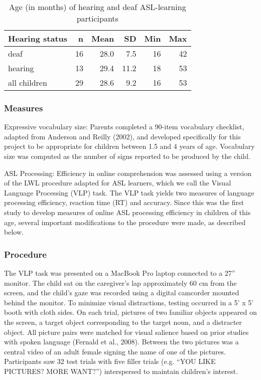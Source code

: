 \documentclass[oneside]{report}
\begin{document}
\begingroup\fontsize{12}{14}\selectfont
\begin{longtable}[t]{lrrrrr}
\caption[Age of ASL-learning children]{\label{tab:sol-demo-table}Age (in months) of hearing and deaf ASL-learning participants}\\
\toprule
\textbf{Hearing status} & \textbf{n} & \textbf{Mean} & \textbf{SD} & \textbf{Min} & \textbf{Max}\\
\midrule
deaf & 16 & 28.0 & 7.5 & 16 & 42\\
hearing & 13 & 29.4 & 11.2 & 18 & 53\\
\hline
all children & 29 & 28.6 & 9.2 & 16 & 53\\
\bottomrule
\end{longtable}
\endgroup{}

\subsubsection{Measures}\label{measures}

Expressive vocabulary size: Parents completed a 90-item vocabulary
checklist, adapted from Anderson and Reilly (2002), and developed
specifically for this project to be appropriate for children between 1.5
and 4 years of age. Vocabulary size was computed as the number of signs
reported to be produced by the child.

ASL Processing: Efficiency in online comprehension was assessed using a
version of the LWL procedure adapted for ASL learners, which we call the
Visual Language Processing (VLP) task. The VLP task yields two measures
of language processing efficiency, reaction time (RT) and accuracy.
Since this was the first study to develop measures of online ASL
processing efficiency in children of this age, several important
modifications to the procedure were made, as described below.

\subsubsection{Procedure}\label{procedure}

The VLP task was presented on a MacBook Pro laptop connected to a 27''
monitor. The child sat on the caregiver's lap approximately 60 cm from
the screen, and the child's gaze was recorded using a digital camcorder
mounted behind the monitor. To minimize visual distractions, testing
occurred in a 5' x 5' booth with cloth sides. On each trial, pictures of
two familiar objects appeared on the screen, a target object
corresponding to the target noun, and a distracter object. All picture
pairs were matched for visual salience based on prior studies with
spoken language (Fernald et al., 2008). Between the two pictures was a
central video of an adult female signing the name of one of the
pictures. Participants saw 32 test trials with five filler trials (e.g.
``YOU LIKE PICTURES? MORE WANT?'') interspersed to maintain children's
interest.
\end{document}
